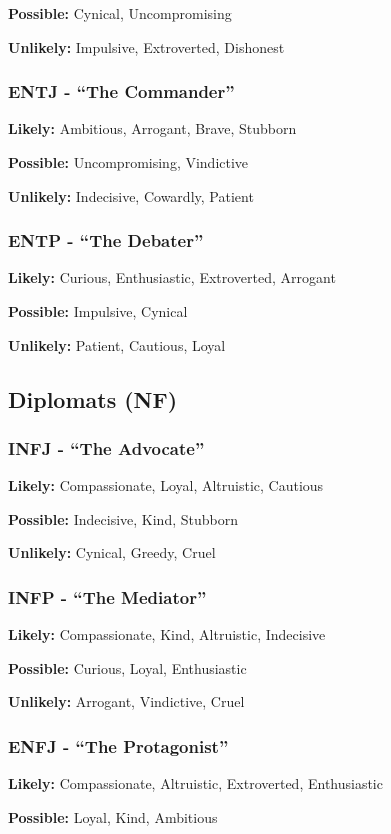 \documentclass[a4paper,twoside,openany]{book}
\begin{document}
\begin{multicols}{2}
	\textbf{Possible:} Cynical, Uncompromising

	\textbf{Unlikely:} Impulsive, Extroverted, Dishonest

	\subsubsection*{ENTJ - ``The Commander''}
	\textbf{Likely:} Ambitious, Arrogant, Brave, Stubborn

	\textbf{Possible:} Uncompromising, Vindictive

	\textbf{Unlikely:} Indecisive, Cowardly, Patient

	\subsubsection*{ENTP - ``The Debater''}
	\textbf{Likely:} Curious, Enthusiastic, Extroverted, Arrogant

	\textbf{Possible:} Impulsive, Cynical

	\textbf{Unlikely:} Patient, Cautious, Loyal

	\subsection{Diplomats (NF)}
	\subsubsection*{INFJ - ``The Advocate''}
	\textbf{Likely:} Compassionate, Loyal, Altruistic, Cautious

	\textbf{Possible:} Indecisive, Kind, Stubborn

	\textbf{Unlikely:} Cynical, Greedy, Cruel

	\subsubsection*{INFP - ``The Mediator''}
	\textbf{Likely:} Compassionate, Kind, Altruistic, Indecisive

	\textbf{Possible:} Curious, Loyal, Enthusiastic

	\textbf{Unlikely:} Arrogant, Vindictive, Cruel

	\subsubsection*{ENFJ - ``The Protagonist''}
	\textbf{Likely:} Compassionate, Altruistic, Extroverted, Enthusiastic

	\textbf{Possible:} Loyal, Kind, Ambitious


\end{multicols}
\end{document}
